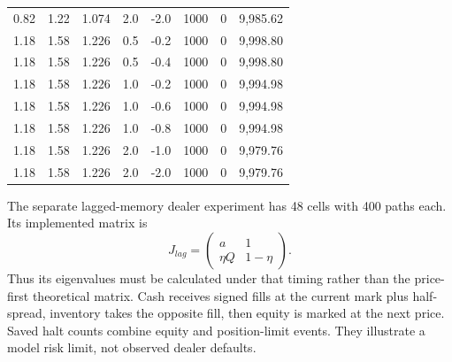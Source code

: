 \documentclass[12pt]{article}
\theoremstyle{definition}
\theoremstyle{remark}
\begin{document}
\begin{table}[htbp]
{\begin{tabular}{lrrrrrrr}
0.82 & 1.22 & 1.074 & 2.0 & -2.0 & 1000 & 0 & 9,985.62 \\
1.18 & 1.58 & 1.226 & 0.5 & -0.2 & 1000 & 0 & 9,998.80 \\
1.18 & 1.58 & 1.226 & 0.5 & -0.4 & 1000 & 0 & 9,998.80 \\
1.18 & 1.58 & 1.226 & 1.0 & -0.2 & 1000 & 0 & 9,994.98 \\
1.18 & 1.58 & 1.226 & 1.0 & -0.6 & 1000 & 0 & 9,994.98 \\
1.18 & 1.58 & 1.226 & 1.0 & -0.8 & 1000 & 0 & 9,994.98 \\
1.18 & 1.58 & 1.226 & 2.0 & -1.0 & 1000 & 0 & 9,979.76 \\
1.18 & 1.58 & 1.226 & 2.0 & -2.0 & 1000 & 0 & 9,979.76 \\
\bottomrule\end{tabular}}
\end{table}

The separate lagged-memory dealer experiment has 48 cells with 400 paths each. Its implemented matrix is \[J_{lag}=\begin{pmatrix}a&1\\\eta Q&1-\eta\end{pmatrix}.\] Thus its eigenvalues must be calculated under that timing rather than the price-first theoretical matrix. Cash receives signed fills at the current mark plus half-spread, inventory takes the opposite fill, then equity is marked at the next price. Saved halt counts combine equity and position-limit events. They illustrate a model risk limit, not observed dealer defaults.
\begin{table}[htbp]
\centering\footnotesize\setlength{\tabcolsep}{3pt}
\caption{Reproduced existing lagged-memory dealer simulations at leverage parameter 10. A halt occurs at nonpositive equity or the model position limit; these causes are not separated in the archived counts. B1/B2/B3 reuse saved model flow moments, not estimated real dealer fills. All 48 cells and exact binomial intervals remain available.}
\label{tab:dealer_drawdown_stats}
\end{table}
\end{document}
